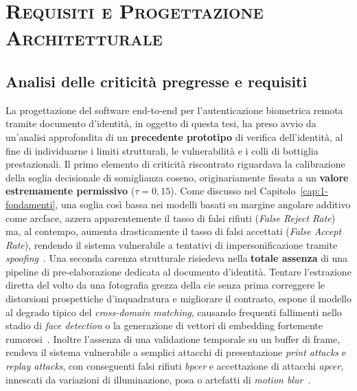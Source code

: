 \chapter{\scshape Requisiti e Progettazione Architetturale}

\section{Analisi delle criticità pregresse e requisiti}\label{cap:2.1-criticita}
La progettazione del software end-to-end per l'autenticazione biometrica remota tramite documento d'identità, in oggetto di questa tesi, ha preso avvio da un'analisi approfondita di un \textbf{precedente prototipo} di verifica dell'identità, al fine di individuarne i limiti strutturali, le vulnerabilità e i colli di bottiglia prestazionali.
Il primo elemento di criticità riscontrato riguardava la calibrazione della soglia decisionale di somiglianza coseno, originariamente fissata a un \textbf{valore estremamente permissivo} ($\tau = 0{,}15$). Come discusso nel Capitolo~\ref{cap:1-fondamenti}, una soglia così bassa nei modelli basati su margine angolare additivo come \gls{arcface}, azzera apparentemente il tasso di falsi rifiuti (\textit{False Reject Rate}) ma, al contempo, aumenta drasticamente il tasso di falsi accettati (\textit{False Accept Rate}), rendendo il sistema vulnerabile a tentativi di impersonificazione tramite \textit{spoofing}~\cite{azizFaceRecognitionBase2024}.
Una seconda carenza strutturale risiedeva nella \textbf{totale assenza} di una pipeline di pre-elaborazione dedicata al documento d'identità. Tentare l'estrazione diretta del volto da una fotografia grezza della \gls{cie} senza prima correggere le distorsioni prospettiche d'inquadratura e migliorare il contrasto, espone il modello al degrado tipico del \textit{cross-domain matching}, causando frequenti fallimenti nello stadio di \textit{face detection} o la generazione di vettori di embedding fortemente rumorosi~\cite{fangIDCardIdentification2017,caldeiraImpactFaceSegmentationBased2026}.
Inoltre l'assenza di una validazione temporale su un buffer di frame, rendeva il sistema vulnerabile a semplici attacchi di presentazione \textit{print attacks} e \textit{replay attacks}, con conseguenti falsi rifiuti \textit{\gls{bpcer}} e accettazione di attacchi \textit{\gls{apcer}}, innescati da variazioni di illuminazione, posa o artefatti di \textit{motion blur}~\cite{azizFaceRecognitionBase2024}.


